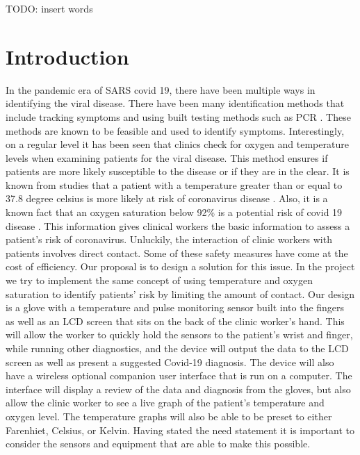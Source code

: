 \documentclass[10pt, conference]{IEEEtran}
\begin{document}
\begin{IEEEkeywords}
TODO: insert words
\end{IEEEkeywords}

\section{Introduction}
In the pandemic era of SARS covid 19, there have been multiple ways in identifying  the viral disease. There have been many identification methods that include tracking symptoms and using built testing methods such as PCR \cite{smyrlaki2020massive}. These methods are known to be feasible and used to identify symptoms. Interestingly, on a regular  level it has been seen that clinics check for oxygen and temperature levels when examining patients for the viral disease. This method ensures if patients are more likely susceptible to the disease or if they are in the clear. It is known from studies that a patient with a temperature greater than or equal to 37.8 degree celsius is more likely at risk of coronavirus disease \cite{jang2020prognostic}. Also, it is a known fact that an oxygen saturation below 92\% is a potential risk of covid 19 disease \cite{jang2020prognostic}. This information gives clinical workers the basic information to assess a patient's risk of coronavirus. Unluckily, the interaction of clinic workers with patients involves direct contact. Some of these safety measures have come at the cost of efficiency. Our proposal is to design a solution for this issue. In the project we try to implement the same concept of using temperature and oxygen saturation to identify patients' risk by limiting the amount of contact. Our design is a glove with a temperature and pulse monitoring sensor built into the fingers as well as an LCD screen that sits on the back of the clinic worker’s hand. This will allow the worker to quickly hold the sensors to the patient’s wrist and finger, while running other diagnostics, and the device will output the data to the LCD screen as well as present a suggested Covid-19 diagnosis. The device will also have a wireless optional companion user interface that is run on a computer. The interface will display a review of the data and diagnosis from the gloves, but also allow the clinic worker to see a live graph of the patient’s temperature and oxygen level. The temperature graphs will also be able to be preset to either Farenhiet, Celsius, or Kelvin. Having stated the need statement it is important to consider the sensors and equipment that are able to make this possible. 
\end{document}
